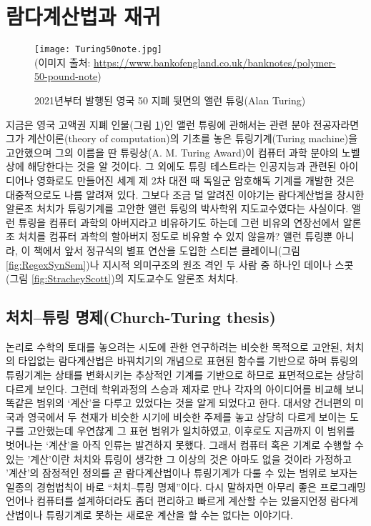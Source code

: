 \section{람다계산법과 재귀}\label{sec:lambdaRec}
\begin{figure}[b]\centering
\texttt{[image: Turing50note.jpg]}\\
{\footnotesize(이미지 출처:
 \url{https://www.bankofengland.co.uk/banknotes/polymer-50-pound-note})}
\caption{2021년부터 발행된 영국 50\textsterling{} 지폐 뒷면의
	앨런 튜링(Alan Turing)\label{fig:Turing50note} }
\end{figure}
지금은 영국 고액권 지폐 인물(그림 \ref{fig:Turing50note})인 앨런 튜링에
관해서는 관련 분야 전공자라면 그가 계산이론(theory of computation)의
기초를 놓은 튜링기계(Turing machine)을 고안했으며 그의 이름을 딴
튜링상(A. M. Turing Award)이 컴퓨터 과학 분야의 노벨상에 해당한다는 것을
알 것이다. 그 외에도 튜링 테스트라는 인공지능과 관련된 아이디어나
영화로도 만들어진 세계 제 2차 대전 때 독일군 암호해독 기계를 개발한 것은
대중적으로도 나름 알려져 있다. 그보다 조금 덜 알려진 이야기는 람다계산법을
창시한 알론조 처치가 튜링기계를 고안한 앨런 튜링의 박사학위 지도교수였다는
사실이다. 앨런 튜링을 컴퓨터 과학의 아버지라고 비유하기도 하는데 그런 비유의
연장선에서 알론조 처치를 컴퓨터 과학의 할아버지 정도로 비유할 수 있지 않을까?
앨런 튜링뿐 아니라, 이 책에서 앞서 정규식의 별표 연산을 도입한
스티븐 클레이니(그림 \ref{fig:RegexSynSem})나 지시적 의미구조의 원조 격인
두 사람 중 하나인 데이나 스콧(그림 \ref{fig:StracheyScott})의 지도교수도
알론조 처치다.

\subsection{처치--튜링 명제(Church-Turing thesis)}
논리로 수학의 토대를 놓으려는 시도에 관한 연구하려는 비슷한 목적으로 고안된,
처치의 타입없는 람다계산법은 바꿔치기의 개념으로 표현된 함수를 기반으로 하며
튜링의 튜링기계는 상태를 변화시키는 추상적인 기계를 기반으로 하므로
표면적으로는 상당히 다르게 보인다. 그런데 학위과정의 스승과 제자로 만나
각자의 아이디어를 비교해 보니 똑같은 범위의 `계산'을 다루고 있었다는 것을
알게 되었다고 한다. 대서양 건너편의 미국과 영국에서 두 천재가 비슷한 시기에
비슷한 주제를 놓고 상당히 다르게 보이는 도구를 고안했는데 우연찮게 그 표현
범위가 일치하였고, 이후로도 지금까지 이 범위를 벗어나는 `계산'을 아직 인류는
발견하지 못했다. 그래서 컴퓨터 혹은 기계로 수행할 수 있는 '계산'이란
처치와 튜링이 생각한 그 이상의 것은 아마도 없을 것이라 가정하고 '계산'의
잠정적인 정의를 곧 람다계산법이나 튜링기계가 다룰 수 있는 범위로 보자는
일종의 경험법칙이 바로 ``처치--튜링 명제''이다.
다시 말하자면 아무리 좋은 프로그래밍언어나 컴퓨터를 설계하더라도 좀더 편리하고
빠르게 계산할 수는 있을지언정 람다계산법이나 튜링기계로 못하는 새로운 계산을
할 수는 없다는 이야기다.


